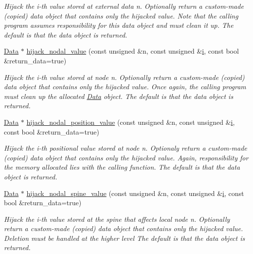 \begin{DoxyCompactItemize}
\begin{DoxyCompactList}\small\item\em Hijack the i-\/th value stored at external data n. Optionally return a custom-\/made (copied) data object that contains only the hijacked value. Note that the calling program assumes responsibility for this data object and must clean it up. The default is that the data object is returned. \end{DoxyCompactList}\item 
\hyperlink{classoomph_1_1Data}{Data} $\ast$ \hyperlink{classoomph_1_1Hijacked_acd1255b8d3783d0bce222095f9f78aa2}{hijack\+\_\+nodal\+\_\+value} (const unsigned \&n, const unsigned \&\hyperlink{cfortran_8h_adb50e893b86b3e55e751a42eab3cba82}{i}, const bool \&return\+\_\+data=true)
\begin{DoxyCompactList}\small\item\em Hijack the i-\/th value stored at node n. Optionally return a custom-\/made (copied) data object that contains only the hijacked value. Once again, the calling program must clean up the allocated \hyperlink{classoomph_1_1Data}{Data} object. The default is that the data object is returned. \end{DoxyCompactList}\item 
\hyperlink{classoomph_1_1Data}{Data} $\ast$ \hyperlink{classoomph_1_1Hijacked_a3c4a0ed281996d74c30f5d4af9a5a324}{hijack\+\_\+nodal\+\_\+position\+\_\+value} (const unsigned \&n, const unsigned \&\hyperlink{cfortran_8h_adb50e893b86b3e55e751a42eab3cba82}{i}, const bool \&return\+\_\+data=true)
\begin{DoxyCompactList}\small\item\em Hijack the i-\/th positional value stored at node n. Optionaly return a custom-\/made (copied) data object that contains only the hijacked value. Again, responsibility for the memory allocated lies with the calling function. The default is that the data object is returned. \end{DoxyCompactList}\item 
\hyperlink{classoomph_1_1Data}{Data} $\ast$ \hyperlink{classoomph_1_1Hijacked_a3d4f055a9ade75b19d69d8aa7eb26417}{hijack\+\_\+nodal\+\_\+spine\+\_\+value} (const unsigned \&n, const unsigned \&\hyperlink{cfortran_8h_adb50e893b86b3e55e751a42eab3cba82}{i}, const bool \&return\+\_\+data=true)
\begin{DoxyCompactList}\small\item\em Hijack the i-\/th value stored at the spine that affects local node n. Optionally return a custom-\/made (copied) data object that contains only the hijacked value. Deletion must be handled at the higher level The default is that the data object is returned. \end{DoxyCompactList}\item 

\end{DoxyCompactItemize}
